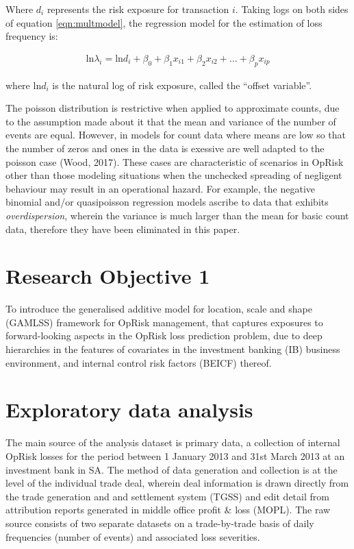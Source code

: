 \documentclass{DissertateUSU}
\begin{document}
Where \(d_i\) represents the risk exposure for transaction \(i\). Taking
logs on both sides of equation \ref{eqn:multmodel}, the regression model
for the estimation of loss frequency is:

\singlespacing

\begin{eqnarray}
\mbox{ln}\lambda_i =  \mbox{ln}d_i + \beta_0 + \beta_1x_{i1} + \beta_2x_{i2} + \ldots + \beta_px_{ip}
\end{eqnarray} \doublespacing

where \(\mbox{ln}d_i\) is the natural log of risk exposure, called the
``offset variable''.

The poisson distribution is restrictive when applied to approximate
counts, due to the assumption made about it that the mean and variance
of the number of events are equal. However, in models for count data
where means are low so that the number of zeros and ones in the data is
exessive are well adapted to the poisson case (Wood, 2017). These cases
are characteristic of scenarios in OpRisk other than those modeling
situations when the unchecked spreading of negligent behaviour may
result in an operational hazard. For example, the negative binomial
and/or quasipoisson regression models ascribe to data that exhibits
\emph{overdispersion}, wherein the variance is much larger than the mean
for basic count data, therefore they have been eliminated in this paper.

\section{Research Objective 1}
\label{sec:Research Objective 1}

To introduce the generalised additive model for location, scale and
shape (GAMLSS) framework for OpRisk management, that captures exposures
to forward-looking aspects in the OpRisk loss prediction problem, due to
deep hierarchies in the features of covariates in the investment banking
(IB) business environment, and internal control risk factors (BEICF)
thereof.

\section{Exploratory data analysis}
\label{sec:Exploratory data analysis}

The main source of the analysis dataset is primary data, a collection of
internal OpRisk losses for the period between 1 January 2013 and 31st
March 2013 at an investment bank in SA. The method of data generation
and collection is at the level of the individual trade deal, wherein
deal information is drawn directly from the trade generation and and
settlement system (TGSS) and edit detail from attribution reports
generated in middle office profit \& loss (MOPL). The raw source
consists of two separate datasets on a trade-by-trade basis of daily
frequencies (number of events) and associated loss severities.\medskip
\end{document}

